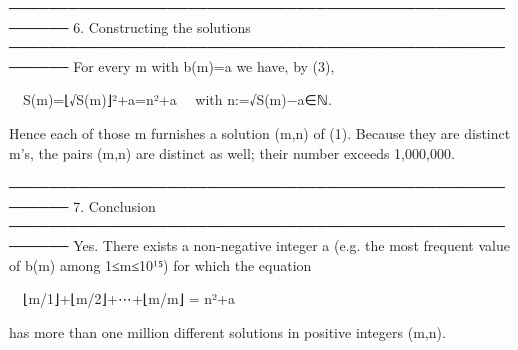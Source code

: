 ────────────────────────────────────────────────────────
6.  Constructing the solutions
────────────────────────────────────────────────────────
For every m with b(m)=a we have, by (3),

 S(m)=⌊√{S(m)}⌋²+a=n²+a  with n:=√{S(m)−a}∈ℕ.

Hence each of those m furnishes a solution (m,n) of (1).
Because they are distinct m’s, the pairs (m,n) are distinct as well; their
number exceeds 1,000,000.

────────────────────────────────────────────────────────
7.  Conclusion
────────────────────────────────────────────────────────
Yes.  There exists a non-negative integer a (e.g. the most frequent value
of b(m) among 1≤m≤10¹⁵) for which the equation

 ⌊m/1⌋+⌊m/2⌋+⋯+⌊m/m⌋ = n²+a

has more than one million different solutions in positive integers (m,n).